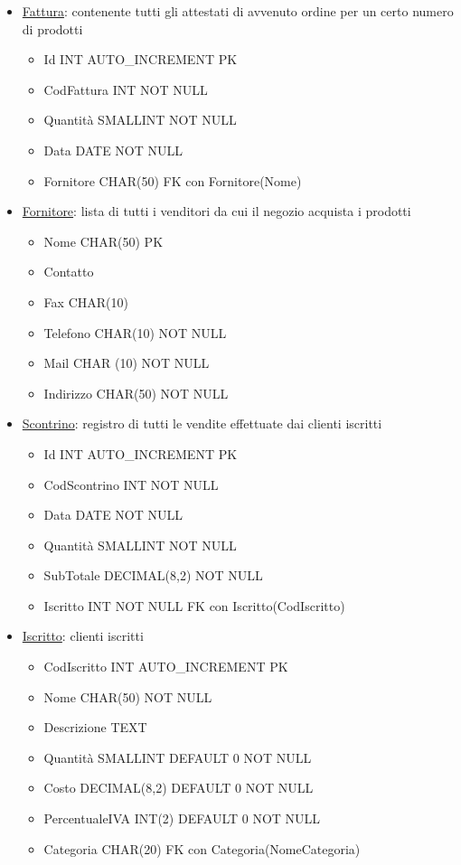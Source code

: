 \begin{itemize}
\item \underline{Fattura}: contenente tutti gli attestati di avvenuto ordine per un certo numero di prodotti
  \begin{itemize}
  \item Id INT AUTO\_INCREMENT PK
  \item CodFattura INT NOT NULL
  \item Quantit\`a SMALLINT NOT NULL
  \item Data DATE NOT NULL
  \item Fornitore CHAR(50) FK con Fornitore(Nome)
  \end{itemize}

\item \underline{Fornitore}: lista di tutti i venditori da cui il negozio acquista i prodotti
  \begin{itemize}
  \item Nome CHAR(50) PK
  \item Contatto
  \item Fax CHAR(10)
  \item Telefono CHAR(10) NOT NULL
  \item Mail CHAR (10) NOT NULL
  \item Indirizzo CHAR(50) NOT NULL
  \end{itemize}

\item \underline{Scontrino}: registro di tutti le vendite effettuate dai clienti iscritti
  \begin{itemize}
  \item Id INT AUTO\_INCREMENT PK
  \item CodScontrino INT NOT NULL
  \item Data DATE NOT NULL
  \item Quantit\`a SMALLINT NOT NULL
  \item SubTotale DECIMAL(8,2) NOT NULL
  \item Iscritto INT NOT NULL FK con Iscritto(CodIscritto)
  \end{itemize}

\item \underline{Iscritto}: clienti iscritti
  \begin{itemize}
  \item CodIscritto INT AUTO\_INCREMENT PK
  \item Nome CHAR(50) NOT NULL
  \item Descrizione TEXT
  \item Quantit\`a SMALLINT DEFAULT 0 NOT NULL
  \item Costo DECIMAL(8,2) DEFAULT 0 NOT NULL
  \item PercentualeIVA INT(2) DEFAULT 0 NOT NULL
  \item Categoria CHAR(20) FK con Categoria(NomeCategoria)
  \end{itemize}


\end{itemize}

